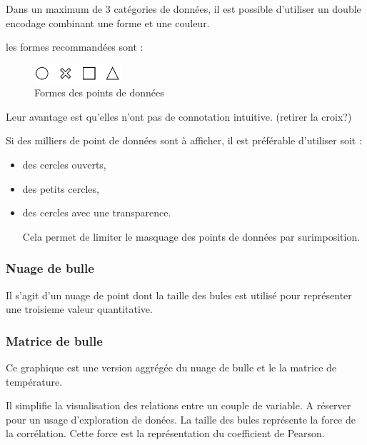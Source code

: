 \documentclass[a4paper,12pt]{article}
\begin{document}
\begin{multicols}{2}
Dans un maximum de 3 catégories de données, il est possible d'utiliser un double encodage combinant une forme et une couleur.\autocite{andreaskrauseBestPracticesData2024}

les formes recommandées sont :

\begin{figure}[H]
\centering
\includegraphics[width=3.2cm]{./img/formes.pdf}
\caption{\label{fig:org2abca4c}Formes des points de données}
\end{figure}

Leur avantage est qu'elles n'ont pas de connotation intuitive.\autocite{andreaskrauseBestPracticesData2024} (retirer la croix?)

Si des milliers de point de données sont à afficher, il est préférable d'utiliser soit :
\begin{itemize}
\item des cercles ouverts,
\item des petits cercles,\autocite{stephenfewComponentlevelGraphDesign2012}
\item des cercles avec une transparence.\autocite{stephenfewComponentlevelGraphDesign2012}

Cela permet de limiter le masquage des points de données par surimposition. \autocite{andreaskrauseBestPracticesData2024}
\end{itemize}
\subsubsection*{Nuage de bulle}
\label{sec:org42f8c27}
Il s'agit d'un nuage de point dont la taille des bules est utilisé pour représenter une troisieme valeur quantitative. \autocite{alansmithLexiqueVisuel}
\subsubsection*{Matrice de bulle}
\label{sec:org0bf0608}
Ce graphique est une version aggrégée du nuage de bulle et le la matrice de température.

Il simplifie la visualisation des relations entre un couple de variable. A réserver pour un usage d'exploration de donées. \autocite{sosulskiGraphics2019} La taille des bules représente la force de la corrélation. Cette force est la représentation du coefficient de Pearson. \autocite{jonathanschwabishRelationship2021}


\end{multicols}
\end{document}
